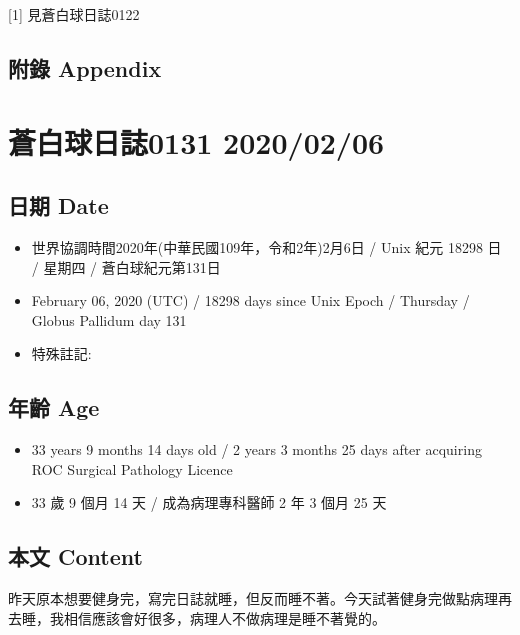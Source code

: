 \documentclass[a5paper, 12pt
]{book}
\providecommand{\tightlist}{%
  \setlength{\itemsep}{0pt}\setlength{\parskip}{0pt}}
\begin{document}
{[}1{]} 見蒼白球日誌0122

\hypertarget{ux9644ux9304-appendix-66}{%
\subsection{附錄 Appendix}\label{ux9644ux9304-appendix-66}}

\hypertarget{ux84bcux767dux7403ux65e5ux8a8c0131-20200206}{%
\section{蒼白球日誌0131
2020/02/06}\label{ux84bcux767dux7403ux65e5ux8a8c0131-20200206}}

\hypertarget{ux65e5ux671f-date-67}{%
\subsection{日期 Date}\label{ux65e5ux671f-date-67}}

\begin{itemize}
\tightlist
\item
  世界協調時間2020年(中華民國109年，令和2年)2月6日 / Unix 紀元 18298 日
  / 星期四 / 蒼白球紀元第131日
\item
  February 06, 2020 (UTC) / 18298 days since Unix Epoch / Thursday /
  Globus Pallidum day 131
\item
  特殊註記:
\end{itemize}

\hypertarget{ux5e74ux9f61-age-67}{%
\subsection{年齡 Age}\label{ux5e74ux9f61-age-67}}

\begin{itemize}
\tightlist
\item
  33 years 9 months 14 days old / 2 years 3 months 25 days after
  acquiring ROC Surgical Pathology Licence
\item
  33 歲 9 個月 14 天 / 成為病理專科醫師 2 年 3 個月 25 天
\end{itemize}

\hypertarget{ux672cux6587-content-67}{%
\subsection{本文 Content}\label{ux672cux6587-content-67}}

昨天原本想要健身完，寫完日誌就睡，但反而睡不著。今天試著健身完做點病理再去睡，我相信應該會好很多，病理人不做病理是睡不著覺的。
\end{document}

